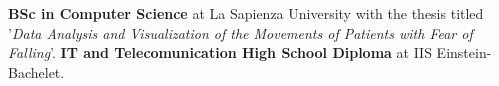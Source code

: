 

\begin{scholarship}
					{\textbf{BSc in Computer Science} at La Sapienza University with the thesis titled '\textit{Data Analysis and Visualization of the Movements of Patients with Fear of Falling}'. }
					{\textbf{IT and Telecomunication High School Diploma} at IIS Einstein-Bachelet.}
\end{scholarship}
